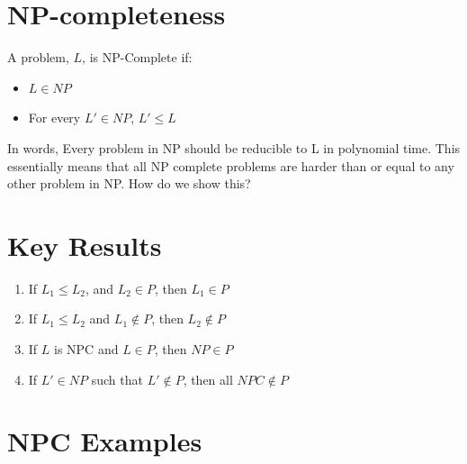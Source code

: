 \documentclass[12pt, letter]{article}
\begin{document}
\section{NP-completeness}%
\label{sec:np_completeness}

A problem, $L$, is NP-Complete if:
\begin{itemize}
	\item $L \in NP$ 
	\item For every $L' \in NP$, $L' \le L$
\end{itemize}
In words, Every problem in NP should be reducible to L in polynomial time. This essentially means that all NP complete problems are harder than or equal to any other problem in NP. How do we show this? \\

\section{Key Results}%
\label{sec:key_results}

\begin{enumerate}
	\item If $L_1 \le L_2$, and $L_2 \in P$, then $L_1 \in P$
	\item If $L_1 \le L_2$ and $L_1 \notin P$, then $L_2 \notin P$
	\item If $L$ is NPC and $L \in P$, then $NP \in P$
	\item If $L' \in NP$ such that $L' \notin P$, then all $NPC \notin P$
\end{enumerate}

\section{NPC Examples}%
\label{sec:npc_examples_}
\end{document}
